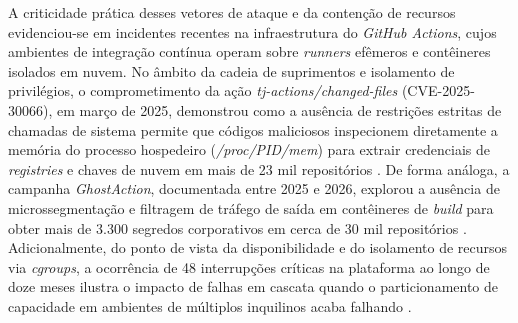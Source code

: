 A criticidade prática desses vetores de ataque e da contenção de recursos evidenciou-se em incidentes recentes na infraestrutura do \emph{GitHub Actions}, cujos ambientes de integração contínua operam sobre \emph{runners} efêmeros e contêineres isolados em nuvem. No âmbito da cadeia de suprimentos e isolamento de privilégios, o comprometimento da ação \emph{tj-actions/changed-files} (CVE-2025-30066), em março de 2025, demonstrou como a ausência de restrições estritas de chamadas de sistema permite que códigos maliciosos inspecionem diretamente a memória do processo hospedeiro (\emph{/proc/PID/mem}) para extrair credenciais de \emph{registries} e chaves de nuvem em mais de 23 mil repositórios \cite{cisa2025tjactions}. De forma análoga, a campanha \emph{GhostAction}, documentada entre 2025 e 2026, explorou a ausência de microssegmentação e filtragem de tráfego de saída em contêineres de \emph{build} para obter mais de 3.300 segredos corporativos em cerca de 30 mil repositórios \cite{gitguardian2026ghostaction}. Adicionalmente, do ponto de vista da disponibilidade e do isolamento de recursos via \emph{cgroups}, a ocorrência de 48 interrupções críticas na plataforma ao longo de doze meses ilustra o impacto de falhas em cascata quando o particionamento de capacidade em ambientes de múltiplos inquilinos acaba falhando \cite{githubstatus2026}.